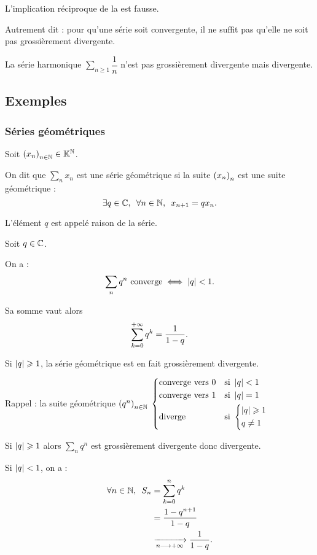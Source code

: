 \begin{rem}
L'implication réciproque de la  est fausse.

Autrement dit : pour qu'une série soit convergente, il ne suffit pas qu'elle ne soit pas grossièrement divergente.
\end{rem}

\begin{dem}
La série harmonique \(\sum_{n\geq1}\dfrac{1}{n}\) n'est pas grossièrement divergente mais divergente.
\end{dem}

\subsection{Exemples}

\subsubsection{Séries géométriques}

\begin{defi}
Soit \(\left(x_n\right)_{n\in\mathbb{N}}\in\mathbb{K}^{\mathbb{N}}\).

On dit que \(\sum_nx_n\) est une série géométrique si la suite \(\left(x_n\right)_n\) est une suite géométrique : \[\quantifs{\exists q\in\C;\forall n\in\N}x_{n+1}=qx_n.\]

L'élément \(q\) est appelé raison de la série.
\end{defi}

\begin{prop}
Soit \(q\in\mathbb{C}\).

On a : \[\sum_nq^n\text{ converge}\iff\left\lvert q\right\rvert<1.\]

Sa somme vaut alors \[\sum_{k=0}^{+\infty}q^k=\dfrac{1}{1-q}.\]

Si \(\left\lvert q\right\rvert\geqslant1\), la série géométrique est en fait grossièrement divergente.
\end{prop}

\begin{dem}
Rappel : la suite géométrique \(\left(q^n\right)_{n\in\mathbb{N}}\) \(\begin{dcases}
\text{converge vers }0 &\text{si }\left\lvert q\right\rvert<1 \\
\text{converge vers }1 &\text{si }\left\lvert q\right\rvert=1 \\
\text{diverge} &\text{si }\begin{dcases}
\left\lvert q\right\rvert\geqslant1 \\
q\not=1
\end{dcases}
\end{dcases}\)

Si \(\left\lvert q\right\rvert\geqslant1\) alors \(\sum_nq^n\) est grossièrement divergente donc divergente.

Si \(\left\lvert q\right\rvert<1\), on a : \[\begin{aligned}
\quantifs{\forall n\in\N}S_n&=\sum_{k=0}^nq^k \\
&=\dfrac{1-q^{n+1}}{1-q} \\
&\tendqd{n\to\pinf}\dfrac{1}{1-q}.
\end{aligned}\]
\end{dem}

